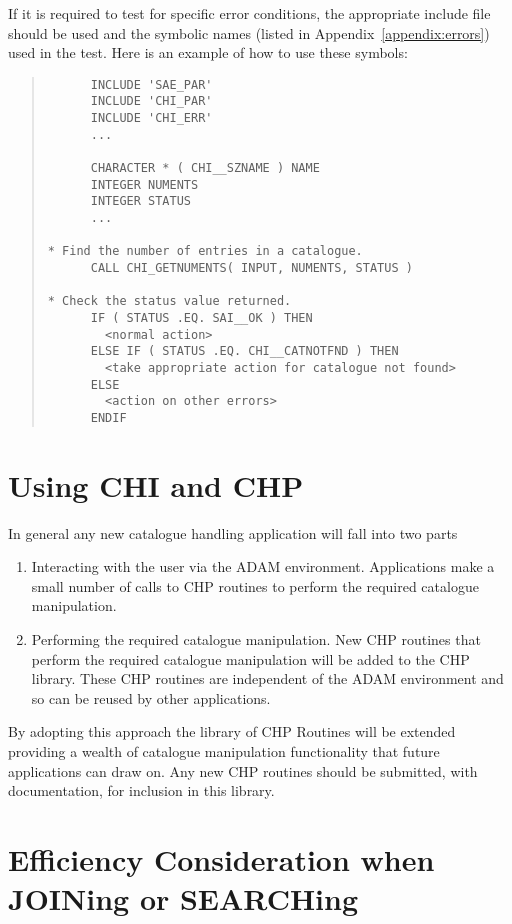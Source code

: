 If it is required to test for specific error conditions, the appropriate
include file should be used and the symbolic names (listed in
Appendix~\ref{appendix:errors}) used in the test. Here is an example of how to
use these symbols:

\begin{quote}
\begin{verbatim}
      INCLUDE 'SAE_PAR'
      INCLUDE 'CHI_PAR'
      INCLUDE 'CHI_ERR'
      ...

      CHARACTER * ( CHI__SZNAME ) NAME
      INTEGER NUMENTS
      INTEGER STATUS
      ...

* Find the number of entries in a catalogue.
      CALL CHI_GETNUMENTS( INPUT, NUMENTS, STATUS )

* Check the status value returned.
      IF ( STATUS .EQ. SAI__OK ) THEN
        <normal action>
      ELSE IF ( STATUS .EQ. CHI__CATNOTFND ) THEN
        <take appropriate action for catalogue not found>
      ELSE
        <action on other errors>
      ENDIF
\end{verbatim}
\end{quote}


\section {Using CHI and CHP}

In general any new catalogue handling application will fall into two parts
\begin{enumerate}

 \item Interacting with the user via the ADAM environment. Applications make
a small number of calls to CHP routines to perform the required catalogue
manipulation.

 \item Performing the required catalogue manipulation. New CHP routines that
perform the required catalogue manipulation will be added to the CHP library.
These CHP routines are
independent of the ADAM environment
and so can be reused by other applications.

\end{enumerate}

By adopting this approach the library of CHP Routines will be extended
providing a wealth of catalogue manipulation functionality that future
applications can draw on. Any new CHP routines should be submitted, with
documentation, for inclusion in this library.

\section{Efficiency Consideration when JOINing or SEARCHing}


